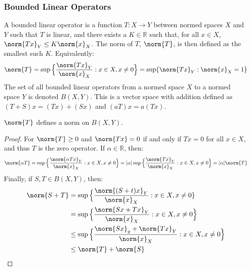 \documentclass[crop=false,class=book,oneside]{standalone}
\begin{document}
        \subsubsection{Bounded Linear Operators}
            A bounded linear operator is a function
            $T:X\rightarrow{Y}$ between normed spaces
            $X$ and $Y$ such that $T$ is linear, and
            there exists a $K\in\mathbb{R}$ such that,
            for all $x\in{X}$,
            $\norm{Tx}_{Y}\leq{K}\norm{x}_{X}$. The
            norm of $T$, $\norm{T}$, is then defined
            as the smallest such $K$. Equivalently:
            \begin{equation*}
                \norm{T}=
                \sup\Big\{\frac{\norm{Tx}_{Y}}{\norm{x}_{X}}:
                          x\in{X},x\ne{0}\Big\}
                =\sup\{\norm{Tx}_{Y}:\norm{x}_{X}=1\}
            \end{equation*}
            The set of all bounded linear operators
            from a normed space $X$ to a normed space
            $Y$ is denoted $B(X,Y)$. This is a vector
            space with addition defined as
            $(T+S)x=(Tx)+(Sx)$ and $(aT)x=a(Tx)$.
            \begin{theorem}
                $\norm{T}$ defines a norm on
                $B(X,Y)$.
            \end{theorem}
            \begin{proof}
                For $\norm{T}\geq{0}$ and
                $\norm{Tx}=0$ if and only if
                $Tx=0$ for all $x\in{X}$, and thus
                $T$ is the zero operator. If
                $\alpha\in\mathbb{R}$, then:
                \begin{equation*}
                    \norm{\alpha{T}}
                    =\sup\Big\{
                        \frac{\norm{\alpha{T}x}_{Y}}{\norm{x}_{X}}:
                        x\in{X},x\ne{0}\Big\}
                    =|\alpha|\sup\Big\{
                        \frac{\norm{Tx}_{Y}}{\norm{x}_{X}}:
                        x\in{X},x\ne{0}\Big\}
                    =|\alpha|\norm{T}
                \end{equation*}
                Finally, if $S,T\in{B}(X,Y)$, then:
                \begin{align*}
                    \norm{S+T}&=\sup\Big\{
                        \frac{\norm{(S+t)x}_{Y}}{\norm{x}_{X}}:
                        x\in{X},x\ne{0}\}\\
                    &=\sup\Big\{
                        \frac{\norm{Sx+Tx}_{Y}}{\norm{x}_{X}}:
                        x\in{X},x\ne{0}\Big\}\\
                    &\leq\sup\Big\{
                        \frac{\norm{Sx}_{y}+\norm{Tx}_{Y}}
                             {\norm{x}_{X}}:
                        x\in{X},x\ne{0}\Big\}\\
                    &\leq\norm{T}+\norm{S}
                \end{align*}
            \end{proof}
\end{document}

